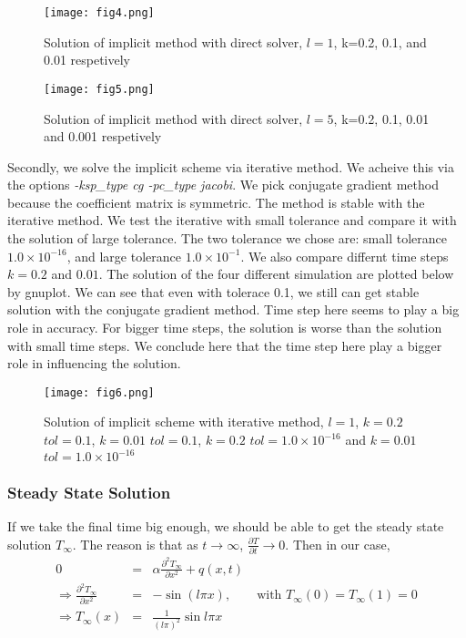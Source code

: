 \documentclass[a4paper,12pt]{article}
\begin{document}
\begin{figure}[H]
\begin{center}
\texttt{[image: fig4.png]}
\caption{Solution of implicit method with direct solver, \(l=1\), k=0.2, 0.1, and 0.01 respetively}
\end{center}
\end{figure}

\begin{figure}[H]
\begin{center}
\texttt{[image: fig5.png]}
\caption{Solution of implicit method with direct solver, \(l=5\), k=0.2, 0.1, 0.01 and 0.001 respetively}
\end{center}
\end{figure}

Secondly, we solve the implicit scheme via iterative method. We acheive this via the options \textit{-ksp\_type cg -pc\_type jacobi}. We pick conjugate gradient method because the coefficient matrix is symmetric.  The method is stable with the iterative method. We test the iterative with small tolerance and compare it with the solution of large tolerance. The two tolerance we chose are: small tolerance \(1.0 \times 10^{-16}\), and large tolerance \(1.0 \times 10^{-1}\). We also compare differnt time steps \(k = 0.2\) and \(0.01\). The solution of the four different simulation are plotted below by gnuplot. We can see that even with tolerace 0.1, we still can get stable solution with the conjugate gradient method. Time step here seems to play a big role in accuracy. For bigger time steps, the solution is worse than the solution with small time steps. We conclude here that the time step here play a bigger role in influencing the solution. 

\begin{figure}[H]
\begin{center}
\texttt{[image: fig6.png]}
\caption{Solution of implicit scheme with iterative method, \(l=1\), \(k=0.2\) \(tol = 0.1\), \(k=0.01\) \(tol = 0.1\), \(k=0.2\) \(tol = 1.0\times 10^{-16}\) and \(k=0.01\) \(tol = 1.0\times 10^{-16}\)}
\end{center}
\end{figure}

\subsubsection{Steady State Solution}
If we take the final time big enough, we should be able to get the steady state solution \(T_{\infty}\). The reason is that as \(t \rightarrow \infty\), \(\frac{\partial T}{\partial t} \rightarrow 0\). Then in our case, 
\begin{eqnarray}
0 & = & \alpha \frac{\partial^{2} T_{\infty}}{\partial x^{2}} + q(x,t) \\
\Rightarrow \frac{\partial^{2} T_{\infty}}{\partial x^{2}} & = & -\sin(l\pi x), \qquad \mbox{with } T_{\infty}(0) = T_{\infty}(1) = 0\\
\Rightarrow T_{\infty}(x) &=& \frac{1}{(l\pi)^{2}}\sin{l\pi x}
\end{eqnarray}  
\end{document}
